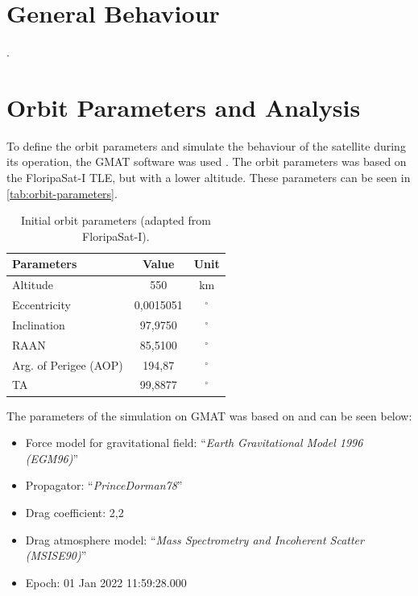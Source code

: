 \section{General Behaviour}

.

\section{Orbit Parameters and Analysis}

To define the orbit parameters and simulate the behaviour of the satellite during its operation, the GMAT software was used \cite{gmat}. The orbit parameters was based on the FloripaSat-I TLE, but with a lower altitude. These parameters can be seen in \autoref{tab:orbit-parameters}.

\begin{table}[!h]
    \centering
    \begin{tabular}{lcc}
        \toprule[1.5pt]
        \textbf{Parameters} & \textbf{Value} & \textbf{Unit} \\
        \midrule
        Altitude                & 550           & km \\
        Eccentricity            & 0,0015051     & $^{\circ}$ \\
        Inclination             & 97,9750       & $^{\circ}$ \\
        RAAN                    & 85,5100       & $^{\circ}$ \\
        Arg. of Perigee (AOP)   & 194,87        & $^{\circ}$ \\
        TA                      & 99,8877       & $^{\circ}$ \\
        \bottomrule[1.5pt]
    \end{tabular}
    \caption{Initial orbit parameters (adapted from FloripaSat-I).}
    \label{tab:orbit-parameters}
\end{table}

The parameters of the simulation on GMAT was based on \cite{marino2016} and can be seen below:

\begin{itemize}
    \item Force model for gravitational field: ``\textit{Earth Gravitational Model 1996 (EGM96)}''
    \item Propagator: ``\textit{PrinceDorman78}''
    \item Drag coefficient: 2,2
    \item Drag atmosphere model: ``\textit{Mass Spectrometry and Incoherent Scatter (MSISE90)}''
    \item Epoch: 01 Jan 2022 11:59:28.000
\end{itemize}

